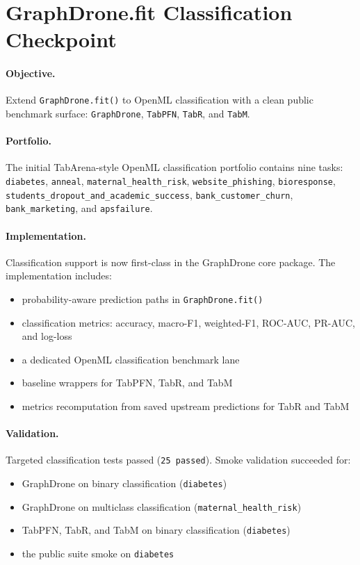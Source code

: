 \section{GraphDrone.fit Classification Checkpoint}

\paragraph{Objective.}
Extend \texttt{GraphDrone.fit()} to OpenML classification with a clean public benchmark surface:
\texttt{GraphDrone}, \texttt{TabPFN}, \texttt{TabR}, and \texttt{TabM}.

\paragraph{Portfolio.}
The initial TabArena-style OpenML classification portfolio contains nine tasks:
\texttt{diabetes}, \texttt{anneal}, \texttt{maternal\_health\_risk},
\texttt{website\_phishing}, \texttt{bioresponse},
\texttt{students\_dropout\_and\_academic\_success},
\texttt{bank\_customer\_churn}, \texttt{bank\_marketing}, and \texttt{apsfailure}.

\paragraph{Implementation.}
Classification support is now first-class in the GraphDrone core package.
The implementation includes:
\begin{itemize}
\item probability-aware prediction paths in \texttt{GraphDrone.fit()}
\item classification metrics: accuracy, macro-F1, weighted-F1, ROC-AUC, PR-AUC, and log-loss
\item a dedicated OpenML classification benchmark lane
\item baseline wrappers for TabPFN, TabR, and TabM
\item metrics recomputation from saved upstream predictions for TabR and TabM
\end{itemize}

\paragraph{Validation.}
Targeted classification tests passed (\texttt{25 passed}).
Smoke validation succeeded for:
\begin{itemize}
\item GraphDrone on binary classification (\texttt{diabetes})
\item GraphDrone on multiclass classification (\texttt{maternal\_health\_risk})
\item TabPFN, TabR, and TabM on binary classification (\texttt{diabetes})
\item the public suite smoke on \texttt{diabetes}
\end{itemize}

